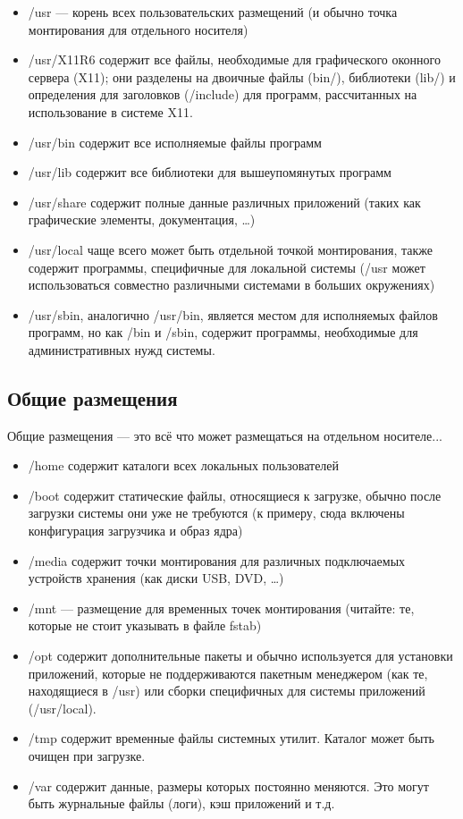 \documentclass[10pt]{book}
\begin{document}
\begin{itemize}
  \item /usr — корень всех пользовательских размещений (и обычно точка монтирования для отдельного носителя)
  \item /usr/X11R6 содержит все файлы, необходимые для графического оконного сервера (X11); они разделены на двоичные файлы (bin/), библиотеки (lib/) и определения для заголовков (/include) для программ, рассчитанных на использование в системе X11.
  \item /usr/bin содержит все исполняемые файлы программ
  \item /usr/lib содержит все библиотеки для вышеупомянутых программ
  \item /usr/share содержит полные данные различных приложений (таких как графические элементы, документация, …)
  \item /usr/local чаще всего может быть отдельной точкой монтирования, также содержит программы, специфичные для локальной системы (/usr может использоваться совместно различными системами в больших окружениях)
  \item /usr/sbin, аналогично /usr/bin, является местом для исполняемых файлов программ, но как /bin и /sbin, содержит программы, необходимые для административных нужд системы.
\end{itemize}
  
\subsection{Общие размещения}

Общие размещения — это всё что может размещаться на отдельном носителе...

\begin{itemize}
  \item /home содержит каталоги всех локальных пользователей
  \item /boot содержит статические файлы, относящиеся к загрузке, обычно после загрузки системы они уже не требуются (к примеру, сюда включены конфигурация загрузчика и образ ядра)
  \item /media содержит точки монтирования для различных подключаемых устройств хранения (как диски USB, DVD, …)
  \item /mnt — размещение для временных точек монтирования (читайте: те, которые не стоит указывать в файле fstab)
  \item /opt содержит дополнительные пакеты и обычно используется для установки приложений, которые не поддерживаются пакетным менеджером (как те, находящиеся в /usr) или сборки специфичных для системы приложений (/usr/local).
  \item /tmp содержит временные файлы системных утилит. Каталог может быть очищен при загрузке.
  \item /var содержит данные, размеры которых постоянно меняются. Это могут быть журнальные файлы (логи), кэш приложений и т.д.
\end{itemize}
\end{document}
